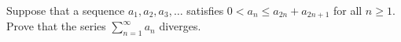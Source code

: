 Suppose that a sequence $a_1, a_2, a_3, \dots$ satisfies
$0 < a_n \leq a_{2n} + a_{2n+1}$ for all $n \geq 1$. Prove that the series
$\sum_{n=1}^{\infty} a_n$ diverges.
